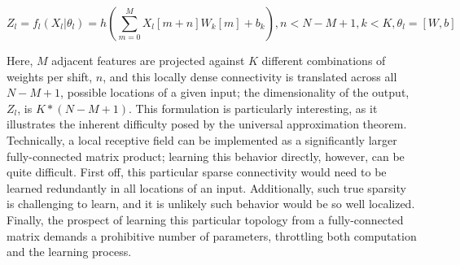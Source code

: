 
\begin{equation}
\label{eq:fclayer}
Z_l = f_l(X_l \vert \theta_l) = h(\sum_{m=0}^{M} X_l[m + n]W_k[m] + b_k), n < N-M+1, k < K, \theta_l = [W, b]
\end{equation}

\noindent Here, $M$ adjacent features are projected against $K$ different combinations of weights per shift, $n$, and this locally dense connectivity is translated across all $N-M+1$, possible locations of a given input;
the dimensionality of the output, $Z_l$, is $K*(N-M+1)$.
This formulation is particularly interesting, as it illustrates the inherent difficulty posed by the universal approximation theorem.
Technically, a local receptive field can be implemented as a significantly larger fully-connected matrix product;
learning this behavior directly, however, can be quite difficult.
First off, this particular sparse connectivity would need to be learned redundantly in all locations of an input.
Additionally, such true sparsity is challenging to learn, and it is unlikely such behavior would be so well localized.
Finally, the prospect of learning this particular topology from a fully-connected matrix demands a prohibitive number of parameters, throttling both computation and the learning process.

